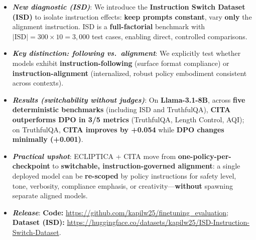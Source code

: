 \documentclass[11pt]{article}
\begin{document}
\begin{defin}
\begin{itemize}[left=-4pt,itemsep=0pt,topsep=0pt,parsep=0pt]
\item[\faVial] \textbf{\textit{New diagnostic (ISD)}}:
We introduce the \textbf{Instruction Switch Dataset (ISD)} to isolate instruction effects:
\textbf{keep prompts constant}, vary \textbf{only} the alignment instruction.
ISD is a \textbf{full-factorial} benchmark with
\(\lvert\text{ISD}\rvert = 300 \times 10 = 3{,}000\) test cases, enabling direct, controlled comparisons.

\item[\faBalanceScale] \textbf{\textit{Key distinction: following vs.\ alignment}}:
We explicitly test whether models exhibit \textbf{instruction-following} (surface format compliance)
or \textbf{instruction-alignment} (internalized, robust policy embodiment consistent across contexts).

\item[\faChartLine] \textbf{\textit{Results (switchability without judges)}}:
On \textbf{Llama-3.1-8B}, across \textbf{five deterministic benchmarks} (including ISD and TruthfulQA),
\textbf{CITA outperforms DPO in 3/5 metrics} (TruthfulQA, Length Control, AQI);
on TruthfulQA, \textbf{CITA improves by +0.054} while \textbf{DPO changes minimally (+0.001)}.

\item[\faTools] \textbf{\textit{Practical upshot}}:
ECLIPTICA + CITA move from \textbf{one-policy-per-checkpoint} to \textbf{switchable, instruction-governed alignment}:
a single deployed model can be \textbf{re-scoped} by policy instructions for safety level, tone, verbosity, compliance emphasis, or creativity---\textbf{without} spawning separate aligned models.

\item[\faCode] \textbf{\textit{Release}}:
\textbf{Code:} \url{https://github.com/kapilw25/finetuning_evaluation};
\textbf{Dataset (ISD):} \url{https://huggingface.co/datasets/kapilw25/ISD-Instruction-Switch-Dataset}.


\end{itemize}
\vspace{-2mm}
\end{defin}





\end{document}
